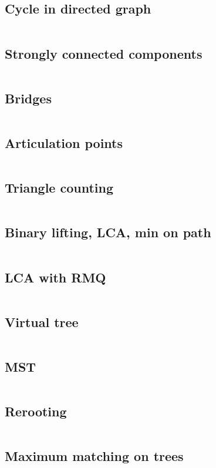 ﻿\documentclass[10pt,twocolumn,oneside]{article}
\begin{document}
\subsection{Cycle in directed graph}
\inputminted[breaklines]{cpp}{Graph algorithms/cycle in directed graph.cpp}
\subsection{Strongly connected components}
\inputminted[breaklines]{cpp}{Graph algorithms/strongly connected components.cpp}
\subsection{Bridges}
\inputminted[breaklines]{cpp}{Graph algorithms/bridges.cpp}
\subsection{Articulation points}
\inputminted[breaklines]{cpp}{Graph algorithms/articulation points.cpp}
\subsection{Triangle counting}
\inputminted[breaklines]{cpp}{Graph algorithms/triangles.cpp}
\subsection{Binary lifting, LCA, min on path}
\inputminted[breaklines]{cpp}{Graph algorithms/binary lifting + lca + min on path.cpp}
\subsection{LCA with RMQ}
\inputminted[breaklines]{cpp}{Graph algorithms/lca with rmq.cpp}
\subsection{Virtual tree}
\inputminted[breaklines]{cpp}{Graph algorithms/virtual tree.cpp}
\subsection{MST}
\inputminted[breaklines]{cpp}{Graph algorithms/mst.cpp}
\subsection{Rerooting}
\inputminted[breaklines]{cpp}{Graph algorithms/rerooting.cpp}
\subsection{Maximum matching on trees}
\inputminted[breaklines]{cpp}{Graph algorithms/maximum matching on trees.cpp}
\end{document}

